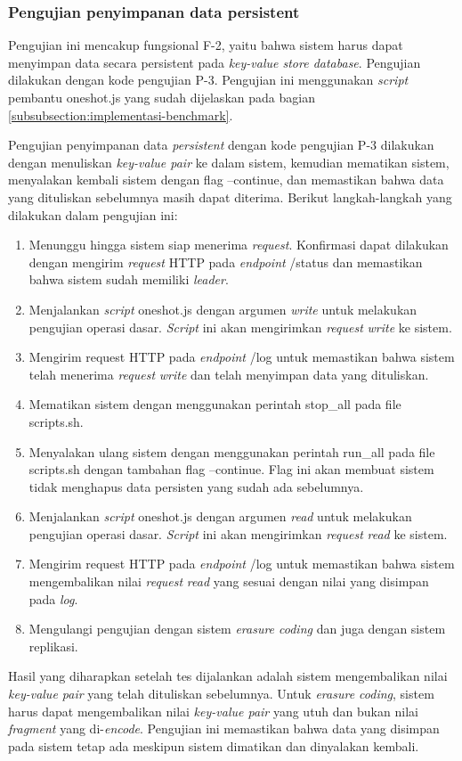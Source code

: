 \subsubsection{Pengujian penyimpanan data persistent}
\label{subsubsection:pengujian-penyimpanan-data-persistent}

Pengujian ini mencakup fungsional F-2, yaitu bahwa sistem harus dapat menyimpan data secara persistent pada \textit{key-value store database}. Pengujian dilakukan dengan kode pengujian P-3. Pengujian ini menggunakan \textit{script} pembantu oneshot.js yang sudah dijelaskan pada bagian \ref{subsubsection:implementasi-benchmark}.

Pengujian penyimpanan data \textit{persistent} dengan kode pengujian P-3 dilakukan dengan menuliskan \textit{key-value pair} ke dalam sistem, kemudian mematikan sistem, menyalakan kembali sistem dengan flag --continue, dan memastikan bahwa data yang dituliskan sebelumnya masih dapat diterima. Berikut langkah-langkah yang dilakukan dalam pengujian ini:

\begin{enumerate}
  \item Menunggu hingga sistem siap menerima \textit{request}. Konfirmasi dapat dilakukan dengan mengirim \textit{request} HTTP pada \textit{endpoint} /status dan memastikan bahwa sistem sudah memiliki \textit{leader}.
  \item Menjalankan \textit{script} oneshot.js dengan argumen \textit{write} untuk melakukan pengujian operasi dasar. \textit{Script} ini akan mengirimkan \textit{request} \textit{write} ke sistem.
  \item Mengirim request HTTP pada \textit{endpoint} /log untuk memastikan bahwa sistem telah menerima \textit{request} \textit{write} dan telah menyimpan data yang dituliskan.
  \item Mematikan sistem dengan menggunakan perintah stop\_all pada file scripts.sh.
  \item Menyalakan ulang sistem dengan menggunakan perintah run\_all pada file scripts.sh dengan tambahan flag --continue. Flag ini akan membuat sistem tidak menghapus data persisten yang sudah ada sebelumnya.
  \item Menjalankan \textit{script} oneshot.js dengan argumen \textit{read} untuk melakukan pengujian operasi dasar. \textit{Script} ini akan mengirimkan \textit{request} \textit{read} ke sistem.
  \item Mengirim request HTTP pada \textit{endpoint} /log untuk memastikan bahwa sistem mengembalikan nilai \textit{request} \textit{read} yang sesuai dengan nilai yang disimpan pada \textit{log}.
  \item Mengulangi pengujian dengan sistem \textit{erasure coding} dan juga dengan sistem replikasi.
\end{enumerate}

Hasil yang diharapkan setelah tes dijalankan adalah sistem mengembalikan nilai \textit{key-value pair} yang telah dituliskan sebelumnya. Untuk \textit{erasure coding}, sistem harus dapat mengembalikan nilai \textit{key-value pair} yang utuh dan bukan nilai \textit{fragment} yang di-\textit{encode}. Pengujian ini memastikan bahwa data yang disimpan pada sistem tetap ada meskipun sistem dimatikan dan dinyalakan kembali.